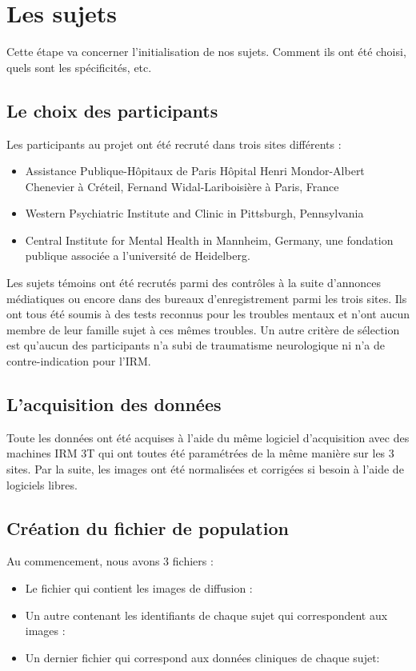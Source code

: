 \section{Les sujets}

Cette étape va concerner l'initialisation de nos sujets. Comment ils ont été choisi, quels sont les spécificités, etc.

\subsection{Le choix des participants}

Les participants au projet ont été recruté dans trois sites différents : 
\begin{itemize}
	\item Assistance Publique-Hôpitaux de Paris Hôpital Henri Mondor-Albert Chenevier à Créteil, Fernand Widal-Lariboisière à Paris, France
	\item Western Psychiatric Institute and Clinic in Pittsburgh, Pennsylvania
	\item Central Institute for Mental Health in Mannheim, Germany, une fondation publique associée a l'université de Heidelberg.
\end{itemize}
Les sujets témoins ont été recrutés parmi des contrôles à la suite d'annonces médiatiques ou encore dans des bureaux d'enregistrement parmi les trois sites. Ils ont tous été soumis à des tests reconnus pour les troubles mentaux et n'ont aucun membre de leur famille sujet à ces mêmes troubles. Un autre critère de sélection est qu'aucun des participants n'a subi de traumatisme neurologique ni n'a de contre-indication pour l'IRM.


\subsection{L'acquisition des données}

Toute les données ont été acquises à l'aide du même logiciel d'acquisition avec des machines IRM 3T qui ont toutes été paramétrées de la même manière sur les 3 sites. Par la suite, les images ont été normalisées et corrigées si besoin à l'aide de logiciels libres.

\subsection{Création du fichier de population} 

Au commencement, nous avons 3 fichiers :
\begin{itemize}
	\item Le fichier qui contient les images de diffusion : 
	\item Un autre contenant les identifiants de chaque sujet qui correspondent aux images : 
	\item Un dernier fichier qui correspond aux données cliniques de chaque sujet:  
\end{itemize}

